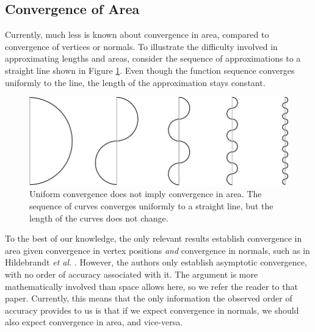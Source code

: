 \subsection{Convergence of Area}
\label{chap1:sec:areaconvergence}

Currently, much less is known about convergence in area, compared to
convergence of vertices or normals. To illustrate the difficulty
involved in approximating lengths and areas, consider the sequence
of approximations to a straight line shown in Figure \ref{fig:uniformconvergence}. 
Even though the function sequence converges uniformly to the line, 
the length of the approximation stays constant.

\begin{figure}[t]
\centering
\includegraphics[width=.8\linewidth]{chapter2/figures/sequence.pdf}
\caption{Uniform convergence does not imply convergence in area. The
  sequence of curves converges uniformly to a straight line, but the
  length of the curves does not change.}
\label{fig:uniformconvergence}
\end{figure}


To the best of our knowledge, the only relevant results establish
convergence in area given convergence in vertex positions \emph{and}
convergence in normals, such as in Hildebrandt {\em et al.}
\cite{hildebrandt06}. However, the authors only establish
asymptotic convergence, with no order of accuracy associated with
it. The argument is more mathematically involved than space allows
here, so we refer the reader to that paper. Currently, this means that
the only information the observed order of accuracy provides to us is that
if we expect convergence in normals, we should also expect convergence
in area, and vice-versa.


